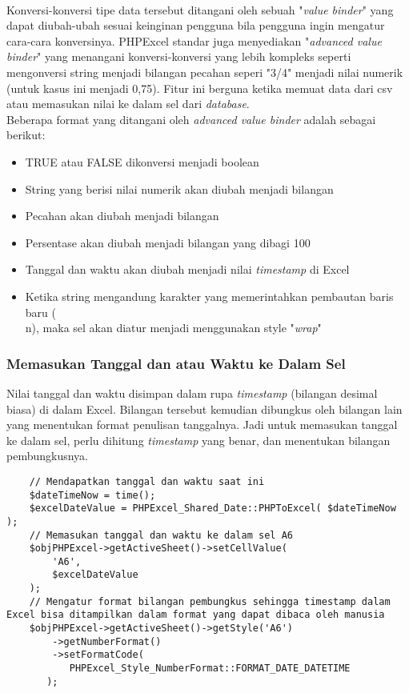 \paragraph{} Konversi-konversi tipe data tersebut ditangani oleh sebuah "\textit{value binder}" yang dapat diubah-ubah sesuai keinginan pengguna bila pengguna ingin mengatur cara-cara konversinya. PHPExcel standar juga menyediakan "\textit{advanced value binder}" yang menangani konversi-konversi yang lebih kompleks seperti mengonversi string menjadi bilangan pecahan seperi "3/4" menjadi nilai numerik (untuk kasus ini menjadi 0,75). Fitur ini berguna ketika memuat data dari csv atau memasukan nilai ke dalam sel dari \textit{database}.\\
Beberapa format yang ditangani oleh \textit{advanced value binder} adalah sebagai berikut:
\begin{itemize}
	\item TRUE atau FALSE dikonversi menjadi boolean
	\item String yang berisi nilai numerik akan diubah menjadi bilangan
	\item Pecahan akan diubah menjadi bilangan
	\item Persentase akan diubah menjadi bilangan yang dibagi 100
	\item Tanggal dan waktu akan diubah menjadi nilai \textit{timestamp} di Excel
	\item Ketika string mengandung karakter yang memerintahkan pembautan baris baru (\\n), maka sel akan diatur menjadi menggunakan style "\textit{wrap}" 
\end{itemize}

\subsubsection{Memasukan Tanggal dan atau Waktu ke Dalam Sel}
Nilai tanggal dan waktu disimpan dalam rupa \textit{timestamp} (bilangan desimal biasa) di dalam Excel. Bilangan tersebut kemudian dibungkus oleh bilangan lain yang menentukan format penulisan tanggalnya. Jadi untuk memasukan tanggal ke dalam sel, perlu dihitung \textit{timestamp} yang benar, dan menentukan bilangan pembungkusnya.
\begin{lstlisting}
	// Mendapatkan tanggal dan waktu saat ini
	$dateTimeNow = time();
	$excelDateValue = PHPExcel_Shared_Date::PHPToExcel( $dateTimeNow );
	// Memasukan tanggal dan waktu ke dalam sel A6
	$objPHPExcel->getActiveSheet()->setCellValue(
	    'A6', 
	    $excelDateValue
	);
	// Mengatur format bilangan pembungkus sehingga timestamp dalam Excel bisa ditampilkan dalam format yang dapat dibaca oleh manusia
	$objPHPExcel->getActiveSheet()->getStyle('A6')
	    ->getNumberFormat()
	    ->setFormatCode(
 	       PHPExcel_Style_NumberFormat::FORMAT_DATE_DATETIME
 	   );
\end{lstlisting}

